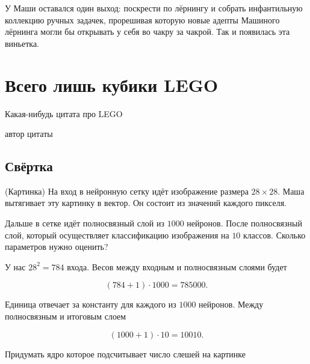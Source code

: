 \documentclass[12pt, a4paper, oneside]{article}
\begin{document}
    У Маши оставался один выход: поскрести по лёрнингу и собрать инфантильную коллекцию ручных задачек, прорешивая которую новые адепты Машиного лёрнинга могли бы открывать у себя во чакру за чакрой. Так и появилась эта виньетка.  
	
\tableofcontents

\newpage 












\section{Всего лишь кубики LEGO} 

\epigraph{Какая-нибудь цитата про LEGO}{автор цитаты}

\subsection{Свёртка} 

\begin{problem}{(Картинка)}
На вход в нейронную сетку идёт изображение размера $28 \times 28$. Маша вытягивает эту картинку в вектор. Он состоит из значений каждого пикселя. 

Дальше в сетке идёт полносвязный слой из $1000$ нейронов. После полносвязный слой, который осуществляет классификацию изображения на $10$ классов. Сколько параметров нужно оценить? 
\end{problem}
\begin{sol}
У нас $28^2 = 784$ входа. Весов между входным и полносвязным слоями будет 

\[ (784 + 1)\cdot 1000 = 785000.\] 

Единица отвечает за константу для каждого из $1000$ нейронов. Между полносвязным и итоговым слоем

\[(1000 + 1) \cdot 10 = 10010. \]
\end{sol} 



Придумать ядро которое подсчитывает число слешей на картинке
\end{document}
